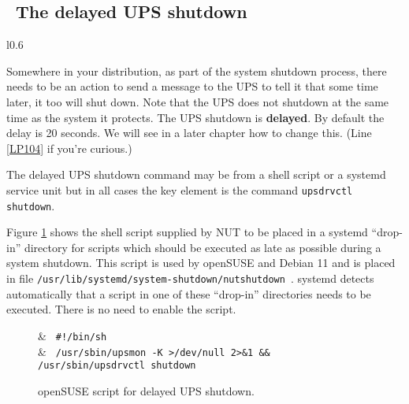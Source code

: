 \documentclass[12pt]{article}
\newlength{\headersep}\setlength{\headersep}{3mm}
\newcommand{\Hsep}{\hspace{\headersep}}
\newcommand{\newcolumn}{\vfill\eject}
\newcommand{\refpage}[1]{\ref{#1}}
\begin{document}
\vspace*{\fill}

\newcolumn
\subsection{\Hsep\ The delayed UPS shutdown}\label{section:delayedUPSshutdown}

\begin{wrapfigure}{l}{0.6\LinePrinterwidth}
\vspace{-6mm}
\begin{center}
\end{center}
\vspace{-6mm}
\caption{Delayed UPS shutdown.\label{fig:delayedUPSshutdown}}
\end{wrapfigure}
%
Somewhere in your distribution, as part of the system shutdown process, there
needs to be an action to send a message to the UPS to tell it that some time
later, it too will shut down.  Note that the UPS does not shutdown at the same
time as the system it protects.  The UPS shutdown is \textbf{delayed}.  By
default the delay is 20 seconds.  We will see in a later chapter how to change
this. (Line \refpage{LP104} if you're curious.)

The delayed UPS shutdown command may be from a shell script or a
systemd service unit but in all cases the key element is the command
\texttt{upsdrvctl shutdown}.

Figure \ref{fig:delayedUPSshutdown-Debian} shows the shell script
supplied by NUT to be placed in a systemd ``drop-in'' directory for
scripts which should be executed as late as possible during a system
shutdown.  This script is used by openSUSE and Debian 11 and is placed
in file
\texttt{/usr{\allowbreak}/lib{\allowbreak}/systemd{\allowbreak}/system-shutdown{\allowbreak}/nutshutdown}\ .
systemd detects automatically that a script in one of these
``drop-in'' directories needs to be executed. There is no need to
enable the script.

\begin{figure}[ht]
\begin{LinePrinter}[0.97\LinePrinterwidth]
\Clunk         & \verb` #!/bin/sh` \\
\Clunk         & \verb` /usr/sbin/upsmon -K >/dev/null 2>&1 && /usr/sbin/upsdrvctl shutdown` \\
\end{LinePrinter}
\vspace{-6mm}
\caption{openSUSE script for delayed UPS shutdown.\label{fig:delayedUPSshutdown-Debian}}
\end{figure}
\end{document}
